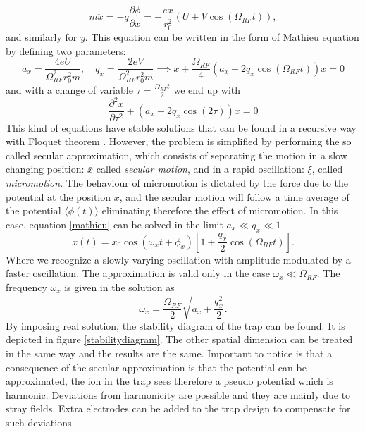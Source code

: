 \begin{equation}
m\ddot{x} = -q \frac{\partial \phi}{\partial x} = - \frac{ex}{r_0^2}\left(U + V \cos(\Omega_{RF} t) \right),
\end{equation}
and similarly for $\ddot{y}$. This equation can be written in the form of Mathieu equation by defining two parameters:
\begin{equation}
a_x = \frac{4eU}{\Omega_{RF}^2r_0^2m}, \quad q_x = \frac{2eV}{\Omega_{RF}^2r_0^2m} \implies \ddot{x} +\frac{\Omega_{RF}}{4} \left(a_x + 2q_x \cos(\Omega_{RF} t )\right)x = 0
\end{equation}
and with a change of variable $\tau = \frac{\Omega_{RF} t}{2}$ we end up with
\begin{equation}
\label{mathieu}
\frac{\partial^2 x}{\partial \tau^2}+\left(a_x + 2q_x \cos(2\tau)\right)x = 0
\end{equation}
This kind of equations have stable solutions that can be found in a recursive way with Floquet theorem \cite{iondynamic}. However, the problem is simplified by performing the so called secular approximation, which consists of separating the motion in a slow changing position: $\bar{x}$ called \emph{secular motion}, and in a rapid oscillation: $\xi$, called \emph{micromotion}. The behaviour of micromotion is dictated by the force due to the potential at the position $\bar{x}$, and the secular motion will follow a time average of the potential $\langle \phi(t) \rangle$ eliminating therefore the effect of micromotion. In this case, equation \eqref{mathieu} can be solved in the limit $a_x \ll q_x \ll 1$
\begin{equation}
x(t) = x_0 \cos(\omega_x t +\phi_x)\left[1 + \frac{q_x}{2}\cos(\Omega_{RF} t) \right].
\end{equation}
Where we recognize a slowly varying oscillation with amplitude modulated by a faster oscillation. The approximation is valid only in the case $\omega_x \ll \Omega_{RF}$. The frequency $\omega_x$ is given in the solution as
\begin{equation}
\omega_x = \frac{\Omega_{RF}}{2}\sqrt{a_x + \frac{q_x^2}{2}}.
\end{equation}
By imposing real solution, the stability diagram of the trap can be found. It is depicted in figure \ref{stabilitydiagram}. The other spatial dimension can be treated in the same way and the results are the same. Important to notice is that a consequence of the secular approximation is that the potential can be approximated, the ion in the trap sees therefore a pseudo potential which is harmonic. Deviations from harmonicity are possible and they are mainly due to stray fields. Extra electrodes can be added to the trap design to compensate for such deviations.


